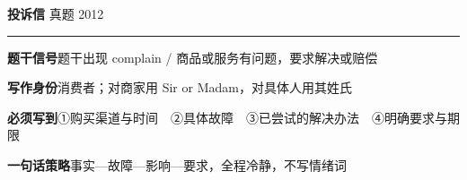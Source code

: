 \documentclass[11pt,a4paper]{ctexart}
\begin{document}
\clearpage
{}\label{g08}
\noindent{\color{accent}\rule{\linewidth}{1.5pt}}\par\vspace{3pt}
\hspace{6pt}
{\LARGE\bfseries 投诉信}\hfill
{\footnotesize\color{gray} 真题 2012}\par
\vspace{1pt}
{\color{accent!35}\rule{\linewidth}{0.5pt}}\par\vspace{3pt}
{\footnotesize {\color{accent}\bfseries 题干信号}\quad 题干出现 complain / 商品或服务有问题，要求解决或赔偿}\par
{\footnotesize {\color{accent}\bfseries 写作身份}\quad 消费者；对商家用 Sir or Madam，对具体人用其姓氏}\par
{\footnotesize {\color{accent}\bfseries 必须写到}\quad ①购买渠道与时间　②具体故障　③已尝试的解决办法　④明确要求与期限}\par
{\footnotesize {\color{accent}\bfseries 一句话策略}\quad 事实—故障—影响—要求，全程冷静，不写情绪词}\par
\end{document}
